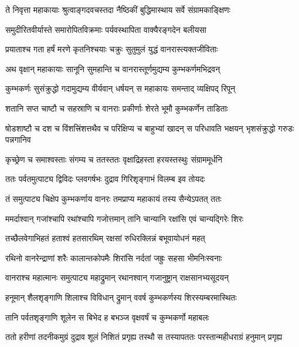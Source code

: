 
\twolineshloka
{ते निवृत्ता महाकायाः श्रुत्वाङ्गदवचस्तदा}
{नैष्ठिकीं बुद्धिमास्थाय सर्वे संग्रामकाङ्क्षिणः} %

\twolineshloka
{समुदीरितवीर्यास्ते समारोपितविक्रमाः}
{पर्यवस्थापिता वाक्यैरङ्गदेन बलीयसा} %

\twolineshloka
{प्रयाताश्च गता हर्षं मरणे कृतनिश्चयाः}
{चक्रुः सुतुमुलं युद्धं वानरास्त्यक्तजीविताः} %

\twolineshloka
{अथ वृक्षान् महाकायाः सानूनि सुमहान्ति च}
{वानरास्तूर्णमुद्यम्य कुम्भकर्णमभिद्रवन्} %

\twolineshloka
{कुम्भकर्णः सुसंक्रुद्धो गदामुद्यम्य वीर्यवान्}
{धर्षयन् स महाकायः समन्ताद् व्यक्षिपद् रिपून्} %

\twolineshloka
{शतानि सप्त चाष्टौ च सहस्राणि च वानराः}
{प्रकीर्णाः शेरते भूमौ कुम्भकर्णेन ताडिताः} %

\threelineshloka
{षोडशाष्टौ च दश च विंशत्त्रिंशत्तथैव च}
{परिक्षिप्य च बाहुभ्यां खादन् स परिधावति}
{भक्षयन् भृशसंक्रुद्धो गरुडः पन्नगानिव} %

\twolineshloka
{कृच्छ्रेण च समाश्वस्ताः संगम्य च ततस्ततः}
{वृक्षाद्रिहस्ता हरयस्तस्थुः संग्राममूर्धनि} %

\twolineshloka
{ततः पर्वतमुत्पाट्य द्विविदः प्लवगर्षभः}
{दुद्राव गिरिशृङ्गाभं विलम्ब इव तोयदः} %

\twolineshloka
{तं समुत्पाट्य चिक्षेप कुम्भकर्णाय वानरः}
{तमप्राप्य महाकायं तस्य सैन्येऽपतत् ततः} %

\twolineshloka
{ममर्दाश्वान् गजांश्चापि रथांश्चापि गजोत्तमान्}
{तानि चान्यानि रक्षांसि एवं चान्यद्गिरेः शिरः} %

\twolineshloka
{तच्छैलवेगाभिहतं हताश्वं हतसारथिम्}
{रक्षसां रुधिरक्लिन्नं बभूवायोधनं महत्} %

\twolineshloka
{रथिनो वानरेन्द्राणां शरैः कालान्तकोपमैः}
{शिरांसि नर्दतां जह्रुः सहसा भीमनिःस्वनाः} %

\twolineshloka
{वानराश्च महात्मानः समुत्पाट्य महाद्रुमान्}
{रथानश्वान् गजानुष्ट्रान् राक्षसानभ्यसूदयन्} %

\twolineshloka
{हनूमान् शैलशृङ्गाणि शिलाश्च विविधान् द्रुमान्}
{ववर्ष कुम्भकर्णस्य शिरस्यम्बरमास्थितः} %

\twolineshloka
{तानि पर्वतशृङ्गाणि शूलेन स बिभेद ह}
{बभञ्ज वृक्षवर्षं च कुम्भकर्णो महाबलः} %

\twolineshloka
{ततो हरीणां तदनीकमुग्रं दुद्राव शूलं निशितं प्रगृह्य}
{तस्थौ स तस्यापततः परस्तान्महीधराग्रं हनुमान् प्रगृह्य} %

